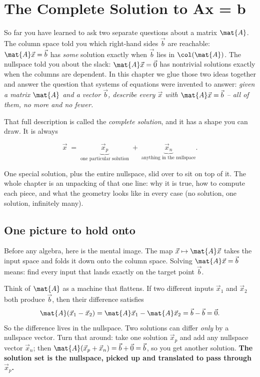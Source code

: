 \chapter{The Complete Solution to Ax = b}

So far you have learned to ask two separate questions about a matrix $\mat{A}$. The
column space told you which right-hand sides $\vec{b}$ are reachable: $\mat{A}\vec{x}=\vec{b}$
has \emph{some} solution exactly when $\vec{b}$ lies in $\col(\mat{A})$. The nullspace told
you about the slack: $\mat{A}\vec{x}=\vec{0}$ has nontrivial solutions exactly when the
columns are dependent. In this chapter we glue those two ideas together and answer the
question that systems of equations were invented to answer: \emph{given a matrix $\mat{A}$
and a vector $\vec{b}$, describe every $\vec{x}$ with $\mat{A}\vec{x}=\vec{b}$ -- all of
them, no more and no fewer.}

That full description is called the \emph{complete solution}, and it has a shape you can
draw. It is always

\[
  \vec{x} \;=\; \underbrace{\vec{x}_p}_{\text{one particular solution}}
        \;+\; \underbrace{\vec{x}_n}_{\text{anything in the nullspace}}.
\]

One special solution, plus the entire nullspace, slid over to sit on top of it. The whole
chapter is an unpacking of that one line: why it is true, how to compute each piece, and
what the geometry looks like in every case (no solution, one solution, infinitely many).

\section{One picture to hold onto}

Before any algebra, here is the mental image. The map $\vec{x}\mapsto \mat{A}\vec{x}$ takes
the input space and folds it down onto the column space. Solving $\mat{A}\vec{x}=\vec{b}$
means: find every input that lands exactly on the target point $\vec{b}$.

\begin{intuitionbox}
Think of $\mat{A}$ as a machine that flattens. If two different inputs $\vec{x}_1$ and
$\vec{x}_2$ both produce $\vec{b}$, then their difference satisfies
\[
  \mat{A}(\vec{x}_1-\vec{x}_2)=\mat{A}\vec{x}_1-\mat{A}\vec{x}_2=\vec{b}-\vec{b}=\vec{0}.
\]
So the difference lives in the nullspace. Two solutions can differ \emph{only} by a
nullspace vector. Turn that around: take one solution $\vec{x}_p$ and add any nullspace
vector $\vec{x}_n$; then $\mat{A}(\vec{x}_p+\vec{x}_n)=\vec{b}+\vec{0}=\vec{b}$, so you get
another solution. \textbf{The solution set is the nullspace, picked up and translated to
pass through $\vec{x}_p$.}
\end{intuitionbox}

